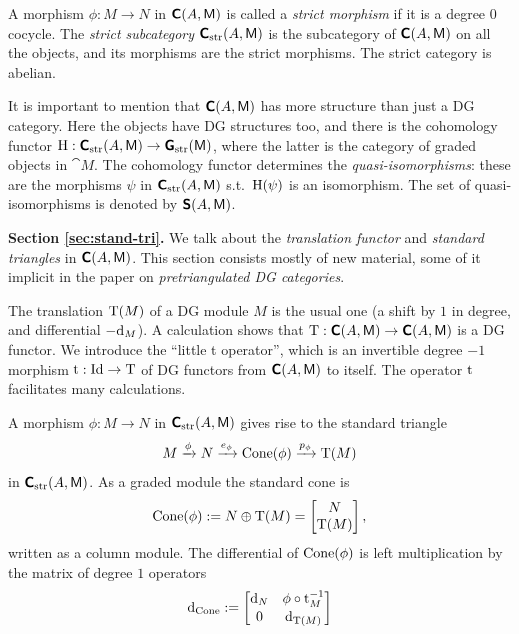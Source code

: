 A morphism $\phi : M \to N$ in $\boldsymbol{\mathsf{C}}(A, \operatorname{\mathsf{M}})$
is called a {\em strict morphism} if it is a degree $0$ cocycle. 
The {\em strict subcategory} $\boldsymbol{\mathsf{C}}_{\mathrm{str}}(A, \operatorname{\mathsf{M}})$
is the subcategory of $\boldsymbol{\mathsf{C}}(A, \operatorname{\mathsf{M}})$ on all the objects, 
and its morphisms are the strict morphisms. The strict category is abelian. 

It is important to mention that $\boldsymbol{\mathsf{C}}(A, \operatorname{\mathsf{M}})$ has 
more structure than just a DG category. Here the objects have DG structures 
too, and there is the cohomology functor 
$\operatorname{H} : \boldsymbol{\mathsf{C}}_{\mathrm{str}}(A, \operatorname{\mathsf{M}}) \to 
\boldsymbol{\mathsf{G}}_{\mathrm{str}}(\operatorname{\mathsf{M}})$,
where the latter is the category of graded objects in $\cat{M}$. 
The cohomology functor determines the {\em quasi-isomorphisms}: these are the 
morphisms $\psi$ in $\boldsymbol{\mathsf{C}}_{\mathrm{str}}(A, \operatorname{\mathsf{M}})$ s.t.\ 
$\operatorname{H}(\psi)$ is an isomorphism. 
The set of quasi-isomorphisms is denoted by 
$\boldsymbol{\mathsf{S}}(A, \operatorname{\mathsf{M}})$.  

\medskip \noindent 
{\bf Section \ref{sec:stand-tri}.} 
We talk about the {\em translation functor} and {\em standard triangles}
in $\boldsymbol{\mathsf{C}}(A, \operatorname{\mathsf{M}})$.
This section consists mostly of new material, some of it implicit in the paper 
\cite{BoKa} on {\em pretriangulated DG categories}. 

The translation $\operatorname{T}(M)$ of a DG module $M$ is the usual one (a shift by 
$1$ in degree, and differential $-\mathrm{d}_M$). A calculation shows that 
$\operatorname{T} : \boldsymbol{\mathsf{C}}(A, \operatorname{\mathsf{M}}) \to \boldsymbol{\mathsf{C}}(A, \operatorname{\mathsf{M}})$
is a DG functor. We introduce the ``little t operator'', which is an invertible 
degree $-1$ morphism 
$\operatorname{t} : \operatorname{Id} \to \operatorname{T}$
of DG functors from $\boldsymbol{\mathsf{C}}(A, \operatorname{\mathsf{M}})$ to itself.
The operator $\operatorname{t}$ facilitates many calculations.  

A morphism $\phi : M \to N$ in $\boldsymbol{\mathsf{C}}_{\mathrm{str}}(A, \operatorname{\mathsf{M}})$
gives rise to the standard triangle
\[ M \xrightarrow{\phi} N \xrightarrow{ e_{\phi}} \operatorname{Cone}(\phi) \xrightarrow{p_{\phi}} \operatorname{T}(M) \]
in $\boldsymbol{\mathsf{C}}_{\mathrm{str}}(A, \operatorname{\mathsf{M}})$.
As a graded module the standard cone is 
\[ \operatorname{Cone}(\phi) := N \oplus \operatorname{T}(M) =
\begin{bmatrix} N \\ \operatorname{T}(M) \end{bmatrix}  , \]
written as a column module. The differential of $\operatorname{Cone}(\phi)$ is left 
multiplication by the matrix of degree $1$ operators 
\[ \mathrm{d}_{\mathrm{Cone}} :=
\begin{bmatrix} \mathrm{d}_N & \phi \circ \operatorname{t}_M^{-1} \\[0.1em] 0 & \mathrm{d}_{\operatorname{T}(M)} \end{bmatrix} \]

